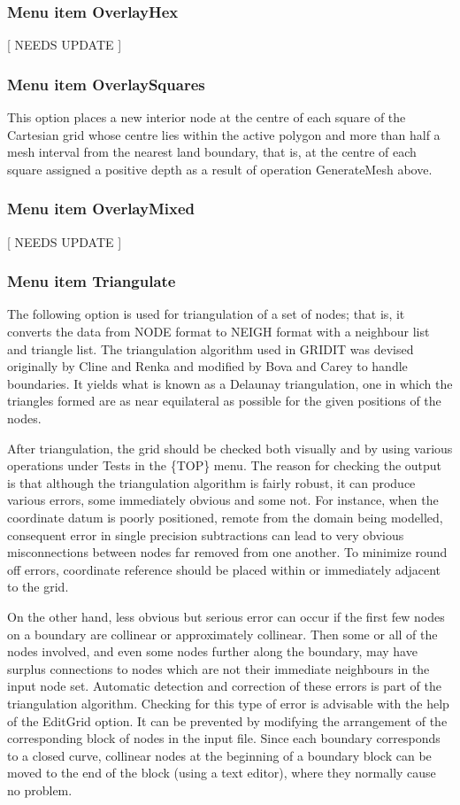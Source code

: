\documentclass{article}
\begin{document}
\subsubsection[Menu item OverlayHex]{Menu item OverlayHex}
[ NEEDS UPDATE ]
\subsubsection[Menu item OverlaySquares]{Menu item OverlaySquares}
This option places a new interior node at the centre of each square of the Cartesian grid whose centre lies within the active polygon and more than half a mesh interval from the nearest land boundary, that is, at the centre of each square assigned a positive depth as a result of operation GenerateMesh above.

\subsubsection[Menu item OverlayMixed]{Menu item OverlayMixed}
[ NEEDS UPDATE ]
\subsubsection[Menu item Triangulate]{Menu item Triangulate}

The following option is used for triangulation of a set of nodes; that is, it converts the data from NODE format to NEIGH format with a neighbour list and triangle list. The triangulation algorithm used in GRIDIT was devised originally by Cline and Renka and modified by Bova and Carey to handle boundaries. It yields what is known as a Delaunay triangulation, one in which the triangles formed are as near equilateral as possible for the given positions of the nodes.

After triangulation, the grid should be checked both visually and by using various operations under Tests in the \{TOP\} menu. The reason for checking the output is that although the triangulation algorithm is fairly robust, it can produce various errors, some immediately obvious and some not. For instance, when the coordinate datum is poorly positioned, remote from the domain being modelled, consequent error in single precision subtractions can lead to very obvious misconnections between nodes far removed from one another. To minimize round off errors, coordinate reference should be placed within or immediately adjacent to the grid. 

On the other hand, less obvious but serious error can occur if the first few nodes on a boundary are collinear or approximately collinear. Then some or all of the nodes involved, and even some nodes further along the boundary, may have surplus connections to nodes which are not their immediate neighbours in the input node set. Automatic detection and correction of these errors is part of the triangulation algorithm. Checking for this type of error is advisable with the help of the EditGrid option. It can be prevented by modifying the arrangement of the corresponding block of nodes in the input file. Since each boundary corresponds to a closed curve, collinear nodes at the beginning of a boundary block can be moved to the end of the block (using a text editor), where they normally cause no problem.
\end{document}
